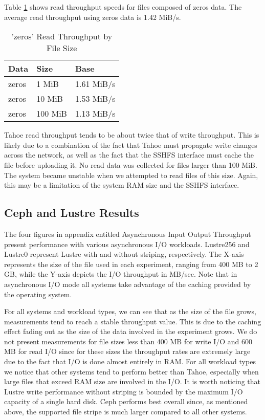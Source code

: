 \documentclass[11pt]{article}
\begin{document}
Table \ref{tbl:TahoeReadZeros} shows read throughput speeds for files
composed of zeros data. The average read throughput using
zeros data is 1.42 MiB/s.

\begin{table}
  \begin{center}
    \begin{tabularx}{\textwidth}{|X|X|X|}
      \hline
      {\bf Data} & {\bf Size} & {\bf Base} \\ \hline
      zeros & 1 MiB & 1.61 MiB/s \\ \hline
      zeros & 10 MiB & 1.53 MiB/s \\ \hline
      zeros & 100 MiB & 1.13 MiB/s \\ \hline
    \end{tabularx}
    \caption{'zeros' Read Throughput by File Size}
    \label{tbl:TahoeReadZeros}
  \end{center}
\end{table}

Tahoe read throughput tends to be about twice that of write
throughput. This is likely due to a combination of the fact that Tahoe
must propagate write changes across the network, as well as the fact
that the SSHFS interface must cache the file before uploading it. No
read data was collected for files larger than 100 MiB. The system
became unstable when we attempted to read files of this size. Again,
this may be a limitation of the system RAM size and the SSHFS interface.

\subsection{Ceph and Lustre Results}
The four figures in appendix entitled Asynchronous Input Output Throughput
present performance with various asynchronous I/O workloads. Lustre256 
and Lustre0 represent Lustre with and without striping, respectively. 
The X-axis represents the size of the file used in each experiment, 
ranging from 400 MB to 2 GB, while the Y-axis depicts the I/O throughput 
in MB/sec. Note that in asynchronous I/O mode all systems take advantage 
of the caching provided by the operating system.

For all systems and workload types, we can see that as the size 
of the file grows, measurements tend to reach a stable throughput value. This 
is due to the caching effect fading out as the size of the data involved in 
the experiment grows. We do not present measurements for file sizes less than 
400 MB for write I/O and 600 MB for read I/O since for these sizes the 
throughput rates are extremely large due to the fact that I/O is done almost 
entirely in RAM. For all workload types we notice that other systems tend to 
perform better than Tahoe, especially when large files that exceed RAM size 
are involved in the I/O. It is worth noticing that Lustre write performance 
without striping is bounded by the maximum I/O capacity of a single hard disk. 
Ceph performs best overall since, as mentioned above, the supported file stripe 
is much larger compared to all other systems.
\end{document}
